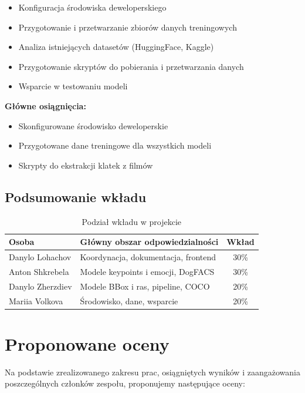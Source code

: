 \documentclass[12pt,a4paper]{article}
\begin{document}
\begin{itemize}
    \item Konfiguracja środowiska deweloperskiego
    \item Przygotowanie i przetwarzanie zbiorów danych treningowych
    \item Analiza istniejących datasetów (HuggingFace, Kaggle)
    \item Przygotowanie skryptów do pobierania i przetwarzania danych
    \item Wsparcie w testowaniu modeli
\end{itemize}

\textbf{Główne osiągnięcia:}
\begin{itemize}
    \item Skonfigurowane środowisko deweloperskie
    \item Przygotowane dane treningowe dla wszystkich modeli
    \item Skrypty do ekstrakcji klatek z filmów
\end{itemize}

\subsection{Podsumowanie wkładu}

\begin{table}[h]
\centering
\begin{tabular}{p{4cm}p{7cm}c}
\toprule
\textbf{Osoba} & \textbf{Główny obszar odpowiedzialności} & \textbf{Wkład} \\
\midrule
Danylo Lohachov & Koordynacja, dokumentacja, frontend & 30\% \\
Anton Shkrebela & Modele keypoints i emocji, DogFACS & 30\% \\
Danylo Zherzdiev & Modele BBox i ras, pipeline, COCO & 20\% \\
Mariia Volkova & Środowisko, dane, wsparcie & 20\% \\
\bottomrule
\end{tabular}
\caption{Podział wkładu w projekcie}
\end{table}

\section{Proponowane oceny}

Na podstawie zrealizowanego zakresu prac, osiągniętych wyników i zaangażowania poszczególnych członków zespołu, proponujemy następujące oceny:
\end{document}
